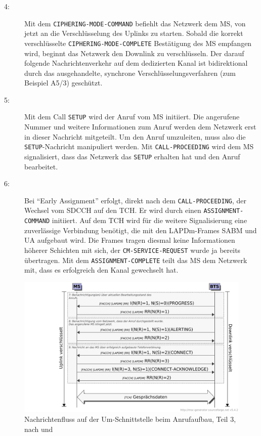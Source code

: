 \begin{description}
\item[4:] Mit dem \texttt{CIPHERING-MODE-COMMAND} \citep[Kap. 9.1.9]{3gpp:04.18} befiehlt das Netzwerk dem \ac{MS}, von jetzt an die Verschlüsselung des Uplinks zu starten. Sobald die korrekt verschlüsselte \texttt{CIPHERING-MODE-COMPLETE} \citep[Kap. 9.1.10]{3gpp:04.18} Bestätigung des \ac{MS} empfangen wird, beginnt das Netzwerk den Downlink zu verschlüsseln. Der darauf folgende Nachrichtenverkehr auf dem dedizierten Kanal ist bidirektional durch das ausgehandelte, synchrone Verschlüsselungsverfahren (zum Beispiel A5/3) geschützt.
\item[5:] Mit dem Call \texttt{SETUP} \citep[Kap. 9.3.23.2]{3gpp:24.008} wird der Anruf vom \ac{MS} initiiert. Die angerufene Nummer und weitere Informationen zum Anruf werden dem Netzwerk erst in dieser Nachricht mitgeteilt. Um den Anruf umzuleiten, muss also die \texttt{SETUP}-Nachricht manipuliert werden. Mit \texttt{CALL-PROCEEDING} \citep[Kap. 9.3.3]{3gpp:04.18} wird dem \ac{MS} signalisiert, dass das Netzwerk das \texttt{SETUP} erhalten hat und den Anruf bearbeitet.
\item[6:] Bei "`Early Assignment"' erfolgt, direkt nach dem \texttt{CALL-PROCEEDING}, der Wechsel vom \ac{SDCCH} auf den \ac{TCH}. Er wird durch einen \texttt{ASSIGNMENT-COMMAND} \citep[Kap. 9.1.2]{3gpp:04.18} initiiert. Auf dem \ac{TCH} wird für die weitere Signalisierung eine zuverlässige Verbindung benötigt, die mit den \ac{LAPDm}-Frames \ac{SABM} und \ac{UA} aufgebaut wird. Die Frames tragen diesmal keine Informationen höherer Schichten mit sich, der \texttt{CM-SERVICE-REQUEST} wurde ja bereits übertragen. Mit dem \texttt{ASSIGNMENT-COMPLETE} teilt das \ac{MS} dem Netzwerk mit, dass es erfolgreich den Kanal gewechselt hat.
\end{description}

\begin{figure}[H]
	\centering \includegraphics[width=1.0\linewidth]{figures/mscgen/gsm_MOC_on_UM03.pdf}
	\caption[Nachrichtenfluss auf der Um-Schnittstelle beim Anrufaufbau, Teil 3]{Nachrichtenfluss auf der \ac{Um}-Schnittstelle beim Anrufaufbau, Teil 3, nach  und } \label{fig:moc-um-3}
\end{figure}

